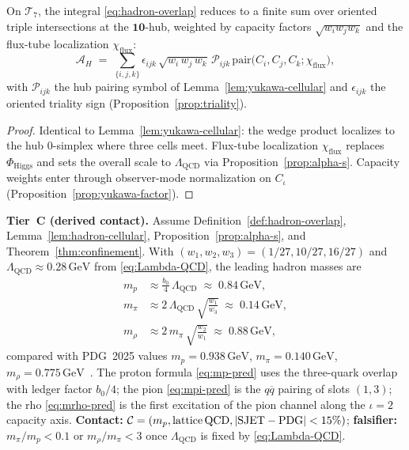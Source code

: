 \begin{lemma}
\label{lem:hadron-cellular}
On $\mathcal{T}_7$, the integral \eqref{eq:hadron-overlap} reduces to a
finite sum over oriented triple intersections at the $\mathbf{10}$-hub,
weighted by capacity factors $\sqrt{w_i w_j w_k}$ and the flux-tube
localization $\chi_{\mathrm{flux}}$:
\begin{equation}\label{eq:hadron-cellular}
  \mathcal{A}_H
  \;=\;
  \sum_{\{i,j,k\}}
  \epsilon_{ijk}\,
  \sqrt{w_i\,w_j\,w_k}\,
  \mathcal{P}_{ijk}\,
  \mathrm{pair}\!\bigl(C_i,C_j,C_k;\chi_{\mathrm{flux}}\bigr),
\end{equation}
with $\mathcal{P}_{ijk}$ the hub pairing symbol of
Lemma~\ref{lem:yukawa-cellular} and $\epsilon_{ijk}$ the oriented
triality sign (Proposition~\ref{prop:triality}).
\end{lemma}

\begin{proof}
Identical to Lemma~\ref{lem:yukawa-cellular}: the wedge product localizes to
the hub $0$-simplex where three cells meet. Flux-tube localization
$\chi_{\mathrm{flux}}$ replaces $\Phi_{\mathrm{Higgs}}$ and sets the
overall scale to $\Lambda_{\mathrm{QCD}}$ via Proposition~\ref{prop:alpha-s}.
Capacity weights enter through observer-mode normalization on $C_\iota$
(Proposition~\ref{prop:yukawa-factor}).
\end{proof}

\begin{prediction}
\label{pred:hadron-masses}
\textbf{Tier~C (derived contact).} Assume
Definition~\ref{def:hadron-overlap},
Lemma~\ref{lem:hadron-cellular}, Proposition~\ref{prop:alpha-s}, and
Theorem~\ref{thm:confinement}. With
$(w_1,w_2,w_3)=(1/27,10/27,16/27)$ and
$\Lambda_{\mathrm{QCD}}\approx 0.28\,\mathrm{GeV}$ from \eqref{eq:Lambda-QCD},
the leading hadron masses are
\begin{align}
  m_p
  &\approx
  \frac{b_0}{4}\,\Lambda_{\mathrm{QCD}}
  \;\approx\;
  0.84\,\mathrm{GeV},
  \label{eq:mp-pred}\\[4pt]
  m_\pi
  &\approx
  2\,\Lambda_{\mathrm{QCD}}\,
  \sqrt{\frac{w_1}{w_3}}
  \;\approx\;
  0.14\,\mathrm{GeV},
  \label{eq:mpi-pred}\\[4pt]
  m_\rho
  &\approx
  2\,m_\pi\,
  \sqrt{\frac{w_2}{w_1}}
  \;\approx\;
  0.88\,\mathrm{GeV},
  \label{eq:mrho-pred}
\end{align}
compared with PDG~2025 values $m_p=0.938\,\mathrm{GeV}$,
$m_\pi=0.140\,\mathrm{GeV}$, $m_\rho=0.775\,\mathrm{GeV}$~\cite{PDG2025}.
The proton formula \eqref{eq:mp-pred} uses the three-quark overlap with
ledger factor $b_0/4$; the pion \eqref{eq:mpi-pred} is the $q\overline{q}$
pairing of slots $(1,3)$; the rho \eqref{eq:mrho-pred} is the first
excitation of the pion channel along the $\iota=2$ capacity axis.
\textbf{Contact:}
$\mathcal{C}=(m_p,\mathrm{lattice\,QCD},|{\rm SJET}-{\rm PDG}|<15\%)$;
\textbf{falsifier:} $m_\pi/m_p<0.1$ or $m_\rho/m_\pi<3$ once
$\Lambda_{\mathrm{QCD}}$ is fixed by \eqref{eq:Lambda-QCD}.
\end{prediction}

